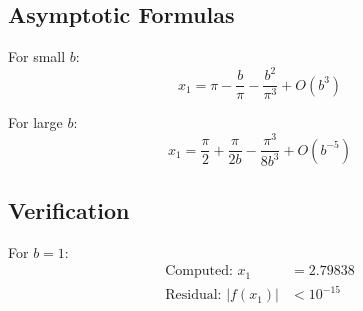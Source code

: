 \documentclass[11pt,a4paper]{article}
\theoremstyle{definition}
\theoremstyle{plain}
\theoremstyle{remark}
\begin{document}
\subsection{Asymptotic Formulas}

For small $b$:
\begin{equation}
x_1 = \pi - \frac{b}{\pi} - \frac{b^2}{\pi^3} + O(b^3)
\label{eq:x1-small-b}
\end{equation}

For large $b$:
\begin{equation}
x_1 = \frac{\pi}{2} + \frac{\pi}{2b} - \frac{\pi^3}{8b^3} + O(b^{-5})
\label{eq:x1-large-b}
\end{equation}

\subsection{Verification}

For $b = 1$:
\begin{align}
\text{Computed: } x_1 &= 2.79838 \label{eq:verify-1} \\
\text{Residual: } |f(x_1)| &< 10^{-15} \label{eq:verify-2}
\end{align}

\end{document}
